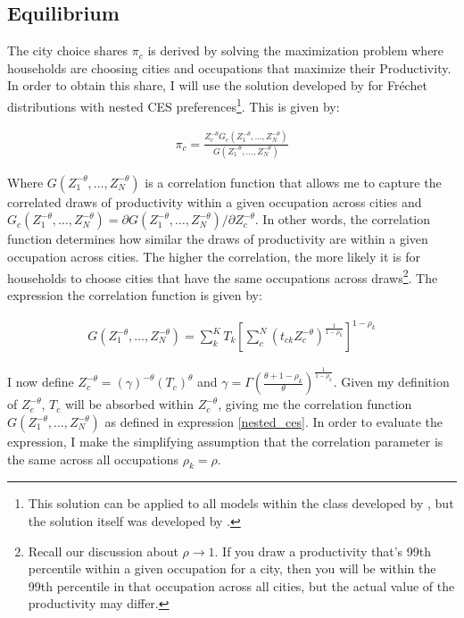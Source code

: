 \documentclass[10pt]{article}
\begin{document}
\subsection{Equilibrium}

The city choice shares $\pi_c$ is derived by solving the maximization problem where households are choosing cities and occupations that maximize their Productivity. In order to obtain this share, I will use the solution developed by \cite{lindandramondo} for Fr\'{e}chet distributions with nested CES preferences\footnote{This solution can be applied to all models within the class developed by \cite{ek}, but the solution itself was developed by \cite{lindandramondo}.}. This is given by:

\begin{align*}
    \pi_c = \frac{Z_c^{- \theta} G_c(Z_1^{- \theta}, \dots, Z_N^{- \theta})}{G(Z_1^{- \theta}, \dots, Z_N^{- \theta})}
\end{align*}

Where $G(Z_1^{- \theta}, \dots, Z_N^{- \theta})$ is a correlation function that allows me to capture the correlated draws of productivity within a given occupation across cities and $G_c (Z_1^{- \theta}, \dots, Z_N^{- \theta}) = \partial G(Z_1^{- \theta}, \dots, Z_N^{- \theta}) / \partial Z_c^{- \theta}$. In other words, the correlation function determines how similar the draws of productivity are within a given occupation across cities. The higher the correlation, the more likely it is for households to choose cities that have the same occupations across draws\footnote{Recall our discussion about $\rho \rightarrow 1$. If you draw a productivity that's 99th percentile within a given occupation for a city, then you will be within the 99th percentile in that occupation across all cities, but the actual value of the productivity may differ.}. The expression the correlation function is given by:

\begin{align}
    G(Z_1^{- \theta}, \dots, Z_N^{- \theta}) = \sum_{k}^{K} T_k \left[ \sum_{c}^{N} (t_{ck} Z_c^{- \theta})^{\frac{1}{1 - \rho_k}} \right]^{1 - \rho_k}
    \label{nested_ces}
\end{align}

I now define $Z_c^{- \theta} = (\gamma)^{- \theta} (T_c)^{\theta}$ and $\gamma = \Gamma (\frac{\theta + 1 - \rho_k}{\theta})^{\frac{1}{1 - \rho_k}}$. Given my definition of $Z_c^{- \theta}$, $T_c$ will be absorbed within $Z_c^{- \theta}$, giving me the correlation function $G(Z_1^{- \theta}, \dots, Z_N^{- \theta})$ as defined in expression \ref{nested_ces}. In order to evaluate the expression, I make the simplifying assumption that the correlation parameter is the same across all occupations $\rho_k = \rho$.
\end{document}
